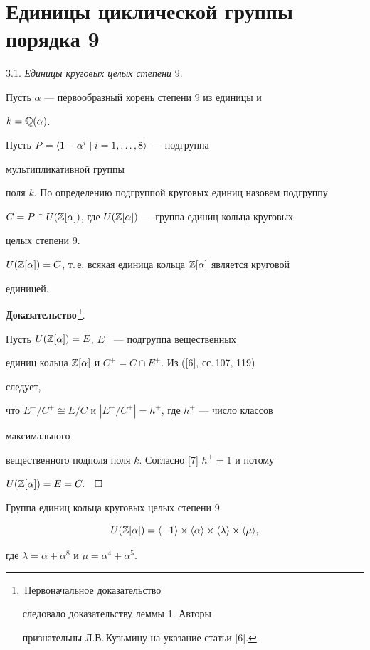  


\section{Единицы циклической группы порядка 9} 


 


3.1. {\it Единицы круговых целых степени} 9. 


Пусть $\alpha$ --- первообразный корень степени 9 из единицы и 


$k=\Bbb Q(\alpha)$. 


Пусть $P=\langle1-\alpha^i\mid i=1,\dotsc,8\rangle$ --- подгруппа 


мультипликативной группы 


поля $k$. По определению подгруппой круговых единиц назовем подгруппу 


$C=P\cap U(\Bbb Z[\alpha])$, где $U(\Bbb Z[\alpha])$ --- группа единиц кольца круговых  


целых степени 9. 


 


\begin{lem} 


$U(\Bbb Z[\alpha])=C$, т.\,е. всякая единица кольца $\Bbb Z[\alpha]$ является круговой 


единицей. 


\end{lem} 


 


{\bf Доказательство}\,\footnote{\,Первоначальное доказательство 


следовало доказательству леммы 1. Авторы  


признательны Л.В.\,Кузьмину на указание статьи [6].}. 


Пусть $U(\Bbb Z[\alpha])=E$, $E^+$ --- подгруппа вещественных 


единиц кольца $\Bbb Z[\alpha]$ и $C^+=C\cap E^+$. Из ([6], сс.\,107, 119) 


следует,  


что $E^+/C^+\cong E/C$ и $|E^+/C^+|=h^+$, где $h^+$ --- число классов 


максимального 


вещественного подполя поля $k$. Согласно [7]\; $h^+=1$ и потому  


$U(\Bbb Z[\alpha])=E=C.\quad\square$


 


\begin{thm} 


Группа единиц кольца круговых целых степени $9$ 


$$ 


U(\myza)=\la-1\ra\times\la\alpha\ra\times\la\lambda\ra 


\times\la\mu\ra, 


$$ 


где $\lambda=\alpha+\alpha^8$ и $\mu=\alpha^4+\alpha^5$. 


\end{thm} 


